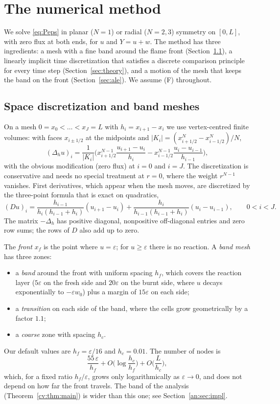 \documentclass[11pt]{amsart}
\theoremstyle{definition}
\theoremstyle{remark}
\newcommand{\ve}{\varepsilon}
\begin{document}
\section{The numerical method}\label{sec:method}

We solve \eqref{eq:Peps} in planar ($N=1$) or radial ($N=2,3$) symmetry on $[0,L]$,
with zero flux at both ends, for $u$ and $Y=u+w$. The method has three ingredients:
a mesh with a fine band around the flame front
(Section~\ref{sec:meshes}), a linearly implicit time discretization that satisfies a
discrete comparison principle for every time step (Section~\ref{sec:theory}), and
a motion of the mesh that keeps the band on the front
(Section~\ref{sec:ale}). We assume (F) throughout.

\subsection{Space discretization and band meshes}\label{sec:meshes}

On a mesh $0=x_0<\dots<x_J=L$ with $h_i=x_{i+1}-x_i$ we use vertex-centred finite
volumes: with faces $x_{i\pm1/2}$ at the midpoints and
$|K_i|=(x_{i+1/2}^N-x_{i-1/2}^N)/N$,
\[
(\Delta_hu)_i=\frac1{|K_i|}\Big(x_{i+1/2}^{N-1}\frac{u_{i+1}-u_i}{h_i}
-x_{i-1/2}^{N-1}\frac{u_i-u_{i-1}}{h_{i-1}}\Big),
\]
with the obvious modification (zero flux) at $i=0$ and $i=J$. The discretization is
conservative and needs no special treatment at $r=0$, where the weight $r^{N-1}$
vanishes. First derivatives, which appear when the mesh moves, are discretized by
the three-point formula that is exact on quadratics,
\[
(D u)_i=\frac{h_{i-1}}{h_i(h_{i-1}+h_i)}(u_{i+1}-u_i)+\frac{h_i}{h_{i-1}(h_{i-1}+h_i)}(u_i-u_{i-1}),
\qquad 0<i<J .
\]
The matrix $-\Delta_h$ has positive diagonal, nonpositive off-diagonal entries and zero
row sums; the rows of $D$ also add up to zero.

The \emph{front} $x_f$ is the point where $u=\ve$; for $u\ge\ve$ there is no reaction.
A \emph{band mesh} has three zones:
\begin{itemize}
\item a \emph{band} around the front with uniform spacing $h_f$, which covers the
reaction layer ($5\ve$ on the fresh side and $20\ve$ on the burnt side, where $u$ decays
exponentially to $-\ve w_0$) plus a margin of $15\ve$ on each side;
\item a \emph{transition} on each side of the band, where the cells grow geometrically
by a factor $1.1$;
\item a \emph{coarse} zone with spacing $h_c$.
\end{itemize}
Our default values are $h_f=\ve/16$ and $h_c=0.01$. The number of nodes is
\[
\frac{55\,\ve}{h_f}+O\Big(\log\frac{h_c}{h_f}\Big)+O\Big(\frac L{h_c}\Big),
\]
which, for a fixed ratio $h_f/\ve$, grows only logarithmically as $\ve\to0$, and does not
depend on how far the front travels. The band of the analysis
(Theorem~\ref{cv:thm:main}) is wider than this one; see Section~\ref{an:sec:impl}.
\end{document}
